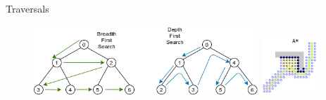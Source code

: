 \documentclass[rgb]{beamer}
\begin{document}
        \begin{frame}{Traversals}
            \begin{figure}
                \begin{center}
                \includegraphics[keepaspectratio, height=0.8\textheight, width=0.75\textwidth]{img/bfs-dfs.png} \hfill
                \includegraphics[keepaspectratio, height=0.8\textheight, width=0.2\textwidth]{img/astar.png}
                \end{center}
            \end{figure}
        \end{frame}
                    
\end{document}
